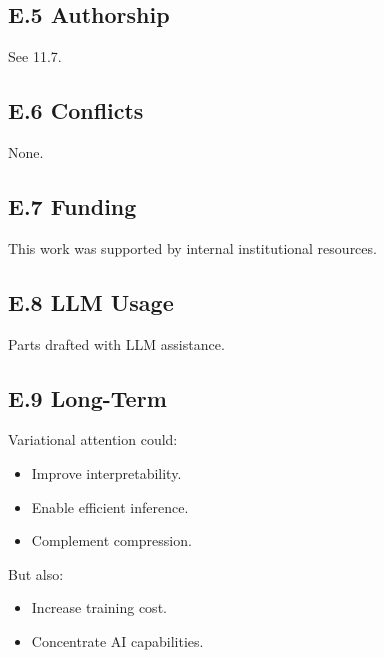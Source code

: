 \subsection{E.5 Authorship}

See  11.7.

\subsection{E.6 Conflicts}

None.

\subsection{E.7 Funding}

This work was supported by internal institutional resources.

\subsection{E.8 LLM Usage}

Parts drafted with LLM assistance.

\subsection{E.9 Long-Term}

Variational attention could:
\begin{itemize}
\item Improve interpretability.
\item Enable efficient inference.
\item Complement compression.

\end{itemize}
But also:
\begin{itemize}
\item Increase training cost.
\item Concentrate AI capabilities.

\end{itemize}
